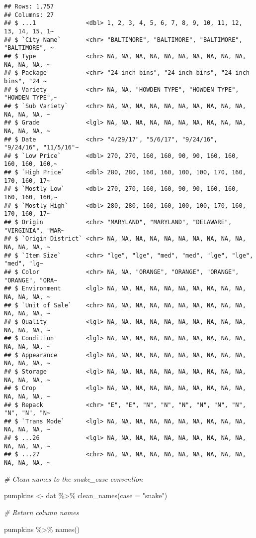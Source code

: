 \documentclass[
]{article}
\newenvironment{Shaded}{\begin{snugshade}}{\end{snugshade}}
\newcommand{\AttributeTok}[1]{\textcolor[rgb]{0.77,0.63,0.00}{#1}}
\newcommand{\CommentTok}[1]{\textcolor[rgb]{0.56,0.35,0.01}{\textit{#1}}}
\newcommand{\FunctionTok}[1]{\textcolor[rgb]{0.00,0.00,0.00}{#1}}
\newcommand{\NormalTok}[1]{#1}
\newcommand{\OtherTok}[1]{\textcolor[rgb]{0.56,0.35,0.01}{#1}}
\newcommand{\SpecialCharTok}[1]{\textcolor[rgb]{0.00,0.00,0.00}{#1}}
\newcommand{\StringTok}[1]{\textcolor[rgb]{0.31,0.60,0.02}{#1}}
\begin{document}
\begin{verbatim}
## Rows: 1,757
## Columns: 27
## $ ...1              <dbl> 1, 2, 3, 4, 5, 6, 7, 8, 9, 10, 11, 12, 13, 14, 15, 1~
## $ `City Name`       <chr> "BALTIMORE", "BALTIMORE", "BALTIMORE", "BALTIMORE", ~
## $ Type              <chr> NA, NA, NA, NA, NA, NA, NA, NA, NA, NA, NA, NA, NA, ~
## $ Package           <chr> "24 inch bins", "24 inch bins", "24 inch bins", "24 ~
## $ Variety           <chr> NA, NA, "HOWDEN TYPE", "HOWDEN TYPE", "HOWDEN TYPE",~
## $ `Sub Variety`     <chr> NA, NA, NA, NA, NA, NA, NA, NA, NA, NA, NA, NA, NA, ~
## $ Grade             <lgl> NA, NA, NA, NA, NA, NA, NA, NA, NA, NA, NA, NA, NA, ~
## $ Date              <chr> "4/29/17", "5/6/17", "9/24/16", "9/24/16", "11/5/16"~
## $ `Low Price`       <dbl> 270, 270, 160, 160, 90, 90, 160, 160, 160, 160, 160,~
## $ `High Price`      <dbl> 280, 280, 160, 160, 100, 100, 170, 160, 170, 160, 17~
## $ `Mostly Low`      <dbl> 270, 270, 160, 160, 90, 90, 160, 160, 160, 160, 160,~
## $ `Mostly High`     <dbl> 280, 280, 160, 160, 100, 100, 170, 160, 170, 160, 17~
## $ Origin            <chr> "MARYLAND", "MARYLAND", "DELAWARE", "VIRGINIA", "MAR~
## $ `Origin District` <chr> NA, NA, NA, NA, NA, NA, NA, NA, NA, NA, NA, NA, NA, ~
## $ `Item Size`       <chr> "lge", "lge", "med", "med", "lge", "lge", "med", "lg~
## $ Color             <chr> NA, NA, "ORANGE", "ORANGE", "ORANGE", "ORANGE", "ORA~
## $ Environment       <lgl> NA, NA, NA, NA, NA, NA, NA, NA, NA, NA, NA, NA, NA, ~
## $ `Unit of Sale`    <chr> NA, NA, NA, NA, NA, NA, NA, NA, NA, NA, NA, NA, NA, ~
## $ Quality           <lgl> NA, NA, NA, NA, NA, NA, NA, NA, NA, NA, NA, NA, NA, ~
## $ Condition         <lgl> NA, NA, NA, NA, NA, NA, NA, NA, NA, NA, NA, NA, NA, ~
## $ Appearance        <lgl> NA, NA, NA, NA, NA, NA, NA, NA, NA, NA, NA, NA, NA, ~
## $ Storage           <lgl> NA, NA, NA, NA, NA, NA, NA, NA, NA, NA, NA, NA, NA, ~
## $ Crop              <lgl> NA, NA, NA, NA, NA, NA, NA, NA, NA, NA, NA, NA, NA, ~
## $ Repack            <chr> "E", "E", "N", "N", "N", "N", "N", "N", "N", "N", "N~
## $ `Trans Mode`      <lgl> NA, NA, NA, NA, NA, NA, NA, NA, NA, NA, NA, NA, NA, ~
## $ ...26             <lgl> NA, NA, NA, NA, NA, NA, NA, NA, NA, NA, NA, NA, NA, ~
## $ ...27             <chr> NA, NA, NA, NA, NA, NA, NA, NA, NA, NA, NA, NA, NA, ~
\end{verbatim}

\begin{Shaded}
\begin{Highlighting}[]
\CommentTok{\# Clean names to the snake\_case convention}

\NormalTok{pumpkins }\OtherTok{\textless{}{-}}\NormalTok{ dat }\SpecialCharTok{\%\textgreater{}\%} \FunctionTok{clean\_names}\NormalTok{(}\AttributeTok{case =} \StringTok{"snake"}\NormalTok{)}

\CommentTok{\# Return column names}

\NormalTok{pumpkins }\SpecialCharTok{\%\textgreater{}\%} \FunctionTok{names}\NormalTok{()}
\end{Highlighting}
\end{Shaded}
\end{document}
